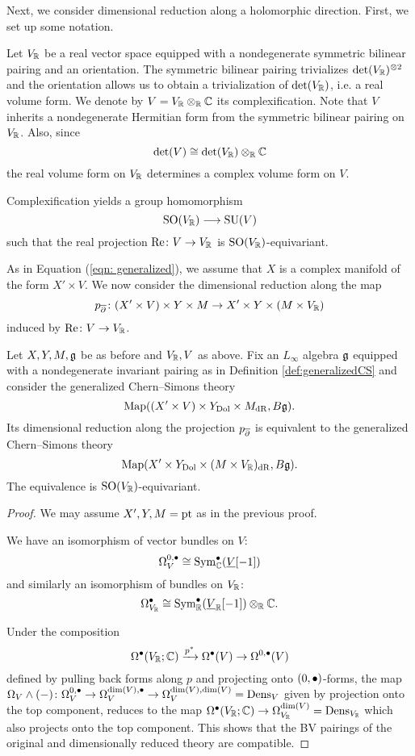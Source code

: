\documentclass[10pt, oneside]{article}
\renewcommand{\Re}{\mathrm{Re}}
\begin{document}
Next, we consider dimensional reduction along a holomorphic direction. 
First, we set up some notation.

Let $V_\mathbb R$ be a real vector space equipped with a nondegenerate symmetric bilinear pairing and an orientation. 
The symmetric bilinear pairing trivializes $\det(V_\mathbb R)^{\otimes 2}$ and the orientation allows us to obtain a trivialization of $\det(V_\mathbb R)$, i.e. a real volume form. 
We denote by $V=V_\mathbb R\otimes_{\mathbb R}\mathbb C$ its complexification. 
Note that $V$ inherits a nondegenerate Hermitian form from the symmetric bilinear pairing on $V_\mathbb R$. 
Also, since
\[\det(V)\cong \det(V_\mathbb R)\otimes_{\mathbb R}\mathbb C\]
the real volume form on $V_\mathbb R$ determines a complex volume form on $V$. 

Complexification yields a group homomorphism
\begin{equation}
\mathrm{SO}(V_\mathbb R)\longrightarrow \mathrm{SU}(V)
\label{eq:SOtoSU}
\end{equation}
such that the real projection $\Re\colon V\rightarrow V_\RR$ is $\mathrm{SO}(V_\mathbb R)$-equivariant.

As in Equation (\ref{eqn: generalized}), we assume that $X$ is a complex manifold of the form $X' \times V$.  We now consider the dimensional reduction along the map
\[
p_{\overline{\partial}}\colon (X' \times V) \times Y \times M \to X' \times Y \times (M \times V_\mathbb R)
\]
induced by ${\rm Re}\colon V \to V_{\mathbb R}$.



\begin{prop} \label{CS_diml_red_prop}
Let $X,Y,M,\mathfrak g$ be as before and $V_\mathbb R, V$ as above. Fix an $L_\infty$ algebra $\mathfrak g$ equipped with a nondegenerate invariant pairing as in Definition \ref{def:generalizedCS} and consider the generalized Chern--Simons theory
\[\operatorname{Map}((X'\times V)\times Y_{\mathrm{Dol}}\times M_{\mathrm{dR}}, B\mathfrak g).\]
Its dimensional reduction along the projection $p_{\overline{\partial}}$ is equivalent to the generalized Chern--Simons theory
\[\operatorname{Map}(X'\times Y_{\mathrm{Dol}}\times (M\times V_\mathbb R)_{\mathrm{dR}}, B\mathfrak g).\]
The equivalence is $\mathrm{SO}(V_\mathbb R)$-equivariant.
\end{prop}
\begin{proof}
We may assume $X',Y,M=\operatorname{pt}$ as in the previous proof.

We have an isomorphism of vector bundles on $V$:
\[\Omega^{0, \bullet}_V\cong {\rm Sym}_\mathbb C^\bullet(\underline{V}[-1])\]
and similarly an isomorphism of bundles on $V_\mathbb R$:
\[\Omega^\bullet_{V_\mathbb R}\cong {\rm Sym}_\mathbb R^\bullet(\underline{V}_\mathbb R[-1])\otimes_\mathbb R\mathbb C.\]

Under the composition
\[\Omega^\bullet(V_\mathbb R; \mathbb C)\xrightarrow{p^*} \Omega^\bullet(V)\rightarrow \Omega^{0, \bullet}(V)\]
defined by pulling back forms along $p$ and projecting onto $(0,\bullet)$-forms, the map $\Omega_V\wedge (-)\colon \Omega^{0, \bullet}_V \to \Omega^{{\rm dim}(V),\bullet}_V \to \Omega^{\dim(V),\dim(V)}_V = {\rm Dens}_V$ given by projection onto the top component, reduces to the map $\Omega^{\bullet}(V_\mathbb R;\mathbb C)\rightarrow \Omega^{\dim(V)}_{V_\mathbb R} = {\rm Dens}_{V_\mathbb R}$ which also projects onto the top component. 
This shows that the BV pairings of the original and dimensionally reduced theory are compatible. 
\end{proof}
\end{document}
